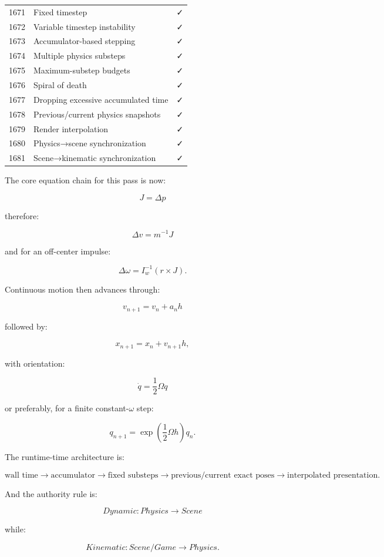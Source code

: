 {\begin{longtable}[]{@{}rll@{}}
1671 & Fixed timestep & ✓ \\
1672 & Variable timestep instability & ✓ \\
1673 & Accumulator-based stepping & ✓ \\
1674 & Multiple physics substeps & ✓ \\
1675 & Maximum-substep budgets & ✓ \\
1676 & Spiral of death & ✓ \\
1677 & Dropping excessive accumulated time & ✓ \\
1678 & Previous/current physics snapshots & ✓ \\
1679 & Render interpolation & ✓ \\
1680 & Physics→scene synchronization & ✓ \\
1681 & Scene→kinematic synchronization & ✓ \\
\end{longtable}
}

The core equation chain for this pass is now:

\[
\boxed{
J
=
\Delta p
}
\]

therefore:

\[
\boxed{
\Delta v
=
m^{-1}J
}
\]

and for an off-center impulse:

\[
\boxed{
\Delta\omega
=
I_w^{-1}
(r\times J).
}
\]

Continuous motion then advances through:

\[
\boxed{
v_{n+1}
=
v_n+a_nh
}
\]

followed by:

\[
\boxed{
x_{n+1}
=
x_n+v_{n+1}h,
}
\]

with orientation:

\[
\boxed{
\dot q
=
\frac12\Omega q
}
\]

or preferably, for a finite constant-\(\omega\) step:

\[
\boxed{
q_{n+1}
=
\exp\left(
\frac12\Omega h
\right)q_n.
}
\]

The runtime-time architecture is:

\[
\boxed{
\text{wall time}
\rightarrow
\text{accumulator}
\rightarrow
\text{fixed substeps}
\rightarrow
\text{previous/current exact poses}
\rightarrow
\text{interpolated presentation}.
}
\]

And the authority rule is:

\[
\boxed{
Dynamic:
Physics\rightarrow Scene
}
\]

while:

\[
\boxed{
Kinematic:
Scene/Game\rightarrow Physics.
}
\]

